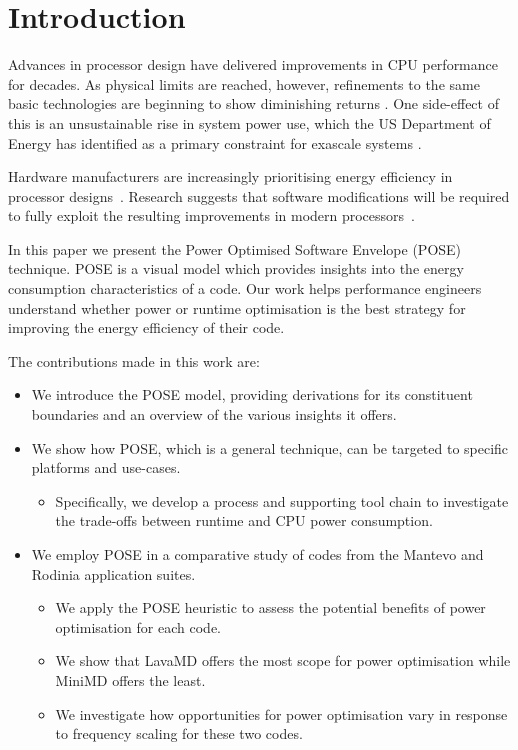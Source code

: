 \section{Introduction}
Advances in processor design have delivered improvements in CPU performance for decades. As physical limits are reached, however, refinements to the same basic technologies are beginning to show diminishing returns \cite{esmaeilzadeh:2011aa}. One side-effect of this is an unsustainable rise in system power use, which the US Department of Energy has identified as a primary constraint for exascale systems \cite{shalf:2011aa}.

Hardware manufacturers are increasingly prioritising energy efficiency in processor designs~\cite{kurd:2014aa}. 
Research suggests that software modifications will be required to fully exploit the resulting improvements in modern processors~\cite{shao:2013aa}.

In this paper we present the Power Optimised Software Envelope (POSE) technique.
POSE is a visual model which provides insights into the energy consumption characteristics of a code.
Our work helps performance engineers understand whether power or runtime optimisation is the best strategy for improving the energy efficiency of their code.

\medskip \noindent
The contributions made in this work are:
\begin{itemize}
  \item We introduce the POSE model, providing derivations for its constituent boundaries and an overview of the various insights it offers.
  \item We show how POSE, which is a general technique, can be targeted to specific platforms and use-cases. 
  \begin{itemize}
    \item Specifically, we develop a process and supporting tool chain to investigate the trade-offs between runtime and CPU power consumption.
  \end{itemize}
  \item We employ POSE in a comparative study of codes from the Mantevo and Rodinia application suites.
  \begin{itemize}
    \item We apply the POSE heuristic to assess the potential benefits of power optimisation for each code.
    \item We show that LavaMD offers the most scope for power optimisation while MiniMD offers the least.
    \item We investigate how opportunities for power optimisation vary in response to frequency scaling for these two codes.
  \end{itemize}
\end{itemize}

